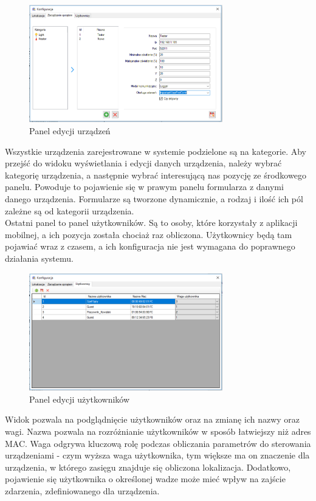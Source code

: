 \documentclass{article}
\begin{document}
	\begin{figure}[H]			
		\centering
		\caption{Panel edycji urządzeń}
		\includegraphics[width=0.75\textwidth]{panel_konf_ster}
	\end{figure}
	Wszystkie urządzenia zarejestrowane w systemie podzielone są na kategorie.	Aby przejść do widoku wyświetlania i edycji danych urządzenia, należy wybrać kategorię urządzenia, a następnie wybrać interesującą nas pozycję ze środkowego panelu. Powoduje to pojawienie się w prawym panelu formularza z danymi danego urządzenia. Formularze są tworzone dynamicznie, a rodzaj i ilość ich pól zależne są od kategorii urządzenia.\\	
	Ostatni panel to panel użytkowników. Są to osoby, które korzystały z aplikacji mobilnej, a ich pozycja została chociaż raz obliczona. Użytkownicy będą tam pojawiać wraz z czasem, a ich konfiguracja nie jest wymagana do poprawnego działania systemu.
	\begin{figure}[H]			
		\centering
		\caption{Panel edycji użytkowników}
		\includegraphics[width=0.75\textwidth]{panel_konf_users}
	\end{figure}
	Widok pozwala na podglądnięcie użytkowników oraz na zmianę ich nazwy oraz wagi. Nazwa pozwala na rozróżnianie użytkowników w sposób łatwiejszy niż adres MAC. Waga odgrywa kluczową rolę podczas obliczania parametrów do sterowania urządzeniami - czym wyższa waga użytkownika, tym większe ma on znaczenie dla urządzenia, w którego zasięgu znajduje się obliczona lokalizacja. Dodatkowo, pojawienie się użytkownika o określonej wadze może mieć wpływ na zajście zdarzenia, zdefiniowanego dla urządzenia.\\
		
\end{document}

